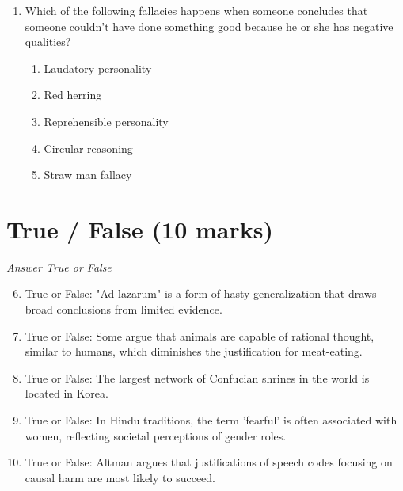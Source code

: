 \documentclass[12pt]{article}
\begin{document}
\begin{enumerate}[label=\arabic*.]
\begin{enumerate}[label=(\alph*)]
    \item strong
    \item reliant on circular reasoning
    \item too complicated
    \item overly simplistic
    \item biased in favor of Cleanthes' conclusion
\end{enumerate}
\item Which of the following fallacies happens when someone concludes that someone couldn't have done something good because he or she has negative qualities?
\begin{enumerate}[label=(\alph*)]
    \item Laudatory personality
    \item Red herring
    \item Reprehensible personality
    \item Circular reasoning
    \item Straw man fallacy
\end{enumerate}
\end{enumerate}

\section*{True / False (10 marks)}
\textit{Answer True or False}
\begin{enumerate}[label=\arabic*.]
\setcounter{enumi}{5}
\item True or False: "Ad lazarum" is a form of hasty generalization that draws broad conclusions from limited evidence.
\item True or False: Some argue that animals are capable of rational thought, similar to humans, which diminishes the justification for meat-eating.
\item True or False: The largest network of Confucian shrines in the world is located in Korea.
\item True or False: In Hindu traditions, the term 'fearful' is often associated with women, reflecting societal perceptions of gender roles.
\item True or False: Altman argues that justifications of speech codes focusing on causal harm are most likely to succeed.
\end{enumerate}
\end{document}
